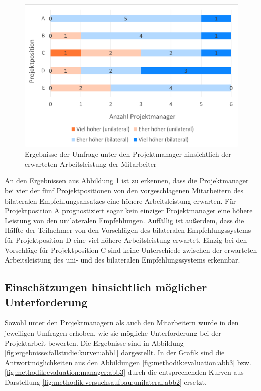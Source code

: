 \begin{figure}[h]
	\centering
	\includegraphics[width=1\textwidth]{gfx/ergebnisse-projektmanager-arbeitsleistung.png}	
	\caption{Ergebnisse der Umfrage unter den Projektmanager hinsichtlich der erwarteten Arbeitsleistung der Mitarbeiter}
	\label{fig:ergebnisse:fallstudie:arbeitsleistung:abb1}
\end{figure}

An den Ergebnissen aus Abbildung \ref{fig:ergebnisse:fallstudie:arbeitsleistung:abb1} ist zu erkennen, dass die Projektmanager bei vier der fünf Projektpositionen von den vorgeschlagenen Mitarbeitern des bilateralen Empfehlungsansatzes eine höhere Arbeitsleistung erwarten. Für Projektposition A prognostiziert sogar kein einziger Projektmanager eine höhere Leistung von den unilateralen Empfehlungen. Auffällig ist außerdem, dass die Hälfte der Teilnehmer von den Vorschlägen des bilateralen Empfehlungssystems für Projektposition D eine viel höhere Arbeitsleistung erwartet. Einzig bei den Vorschläge für Projektposition C sind keine Unterschiede zwischen der erwarteten Arbeitsleistung des uni- und des bilateralen Empfehlungssystems erkennbar.

\subsection{Einschätzungen hinsichtlich möglicher Unterforderung}
\label{ch:ergebnisse:fallstudie:kurven}
Sowohl unter den Projektmanagern als auch den Mitarbeitern wurde in den jeweiligen Umfragen erhoben, wie sie mögliche Unterforderung bei der Projektarbeit bewerten. Die Ergebnisse sind in Abbildung \ref{fig:ergebnisse:fallstudie:kurven:abb1} dargestellt. In der Grafik sind die Antwortmöglichkeiten aus den Abbildungen \ref{fig:methodik:evaluation:abb3} bzw. \ref{fig:methodik:evaluation:manager:abb3} durch die entsprechenden Kurven aus Darstellung \ref{fig:methodik:versuchsaufbau:unilateral:abb2} ersetzt.

